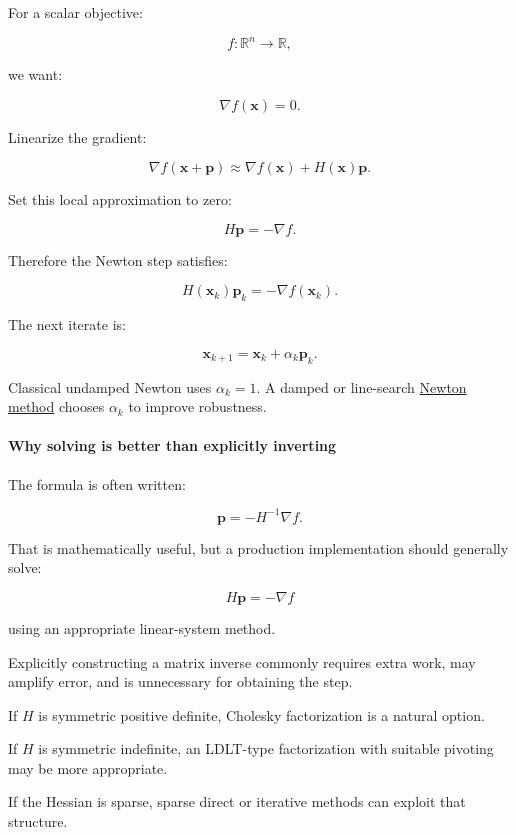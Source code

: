 For a scalar objective:

\[
f:\mathbb R^n\to\mathbb R,
\]

we want:

\[
\nabla f(\mathbf x)=0.
\]

Linearize the gradient:

\[
\nabla f(\mathbf x+\mathbf p) \approx \nabla f(\mathbf x)+H(\mathbf x)\mathbf p.
\]

Set this local approximation to zero:

\[
H\mathbf p=-\nabla f.
\]

Therefore the Newton step satisfies:

\[
\boxed{ H(\mathbf x_k)\mathbf p_k=-\nabla f(\mathbf x_k) }.
\]

The next iterate is:

\[
\mathbf x_{k+1}=\mathbf x_k+\alpha_k\mathbf p_k.
\]

Classical undamped Newton uses \(\alpha_k=1\). A damped or line-search \hyperref[02-foundations-ii-ch026-optimization-and-inverse-problems]{Newton method} chooses \(\alpha_k\) to improve robustness.

\paragraph{Why solving is better than explicitly inverting}\label{02-foundations-ii-ch026-why-solving-is-better-than-explicitly-inverting}

\hypertarget{02-foundations-ii-ch026-why-solving-is-better-than-explicitly-inverting}{}

The formula is often written:

\[
\mathbf p=-H^{-1}\nabla f.
\]

That is mathematically useful, but a production implementation should generally solve:

\[
H\mathbf p=-\nabla f
\]

using an appropriate linear-system method.

Explicitly constructing a matrix inverse commonly requires extra work, may amplify error, and is unnecessary for obtaining the step.

If \(H\) is symmetric positive definite, Cholesky factorization is a natural option.

If \(H\) is symmetric indefinite, an LDLT-type factorization with suitable pivoting may be more appropriate.

If the Hessian is sparse, sparse direct or iterative methods can exploit that structure.

